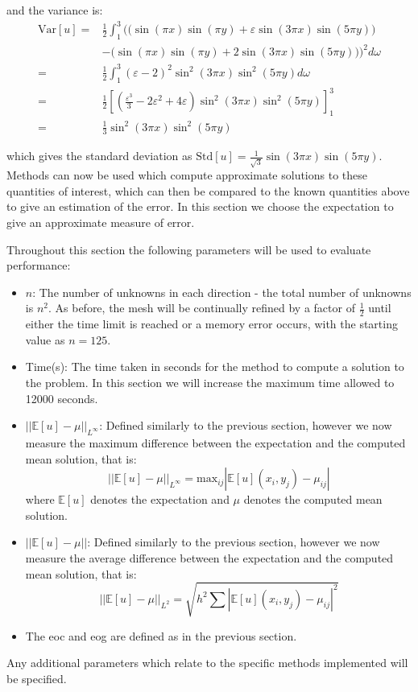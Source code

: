 \documentclass[11pt]{article}
\numberwithin{equation}{section}
\begin{document}
and the variance is:
\begin{equation}
\begin{split}
\text{Var}[u] = & \frac{1}{2} \int_{1}^3 \Big( \big( \sin(\pi x) \sin(\pi y) + \varepsilon \sin(3 \pi x) \sin(5 \pi y) \big) \\
& - \big(\sin(\pi x) \sin(\pi y) + 2\sin(3\pi x)\sin(5\pi y) \big) \Big)^2 d \omega \\
= & \frac{1}{2} \int_{1}^3 (\varepsilon-2)^2 \sin^2 (3 \pi x) \sin^2 (5 \pi y) d \omega \\
= & \frac{1}{2} \left[ \left( \frac{\varepsilon^3}{3}-2\varepsilon^2 + 4\varepsilon \right) \sin^2 (3 \pi x) \sin^2 (5 \pi y) \right]_{1}^3 \\
= & \frac{1}{3} \sin^2 (3 \pi x) \sin^2 (5 \pi y)
\end{split}
\end{equation}

which gives the standard deviation as $\text{Std}[u] = \frac{1}{\sqrt{3}} \sin(3 \pi x) \sin(5 \pi y)$. Methods can now be used which compute approximate solutions to these quantities of interest, which can then be compared to the known quantities above to give an estimation of the error. In this section we choose the expectation to give an approximate measure of error.

Throughout this section the following parameters will be used to evaluate performance:
\begin{itemize}
\item $n$: The number of unknowns in each direction - the total number of unknowns is $n^2$. As before, the mesh will be continually refined by a factor of $\frac{1}{2}$ until either the time limit is reached or a memory error occurs, with the starting value as $n=125$.
\item Time(s): The time taken in seconds for the method to compute a solution to the problem. In this section we will increase the maximum time allowed to 12000 seconds. 
\item $|| \mathbb{E}[u] - \mu ||_{L^\infty} $: Defined similarly to the previous section, however we now measure the maximum difference between the expectation and the computed mean solution, that is:
 \[ || \mathbb{E}[u] - \mu ||_{L^\infty} = \text{max}_{ij} | \mathbb{E}[u](x_i,y_j) - \mu_{ij} | \]
where $\mathbb{E}[u]$ denotes the expectation and $\mu$ denotes the computed mean solution.
\item $\left|\left| \mathbb{E}[u] - \mu \right|\right|$: Defined similarly to the previous section, however we now measure the average difference between the expectation and the computed mean solution, that is:
\[ \left| \left| \mathbb{E}[u] - \mu \right| \right|_{L^2} = \sqrt{h^2 \sum \left| \mathbb{E}[u](x_i,y_j) - \mu_{ij} \right|^2} \]
\item The eoc and eog are defined as in the previous section.
\end{itemize}
Any additional parameters which relate to the specific methods implemented will be specified. 
\end{document}
